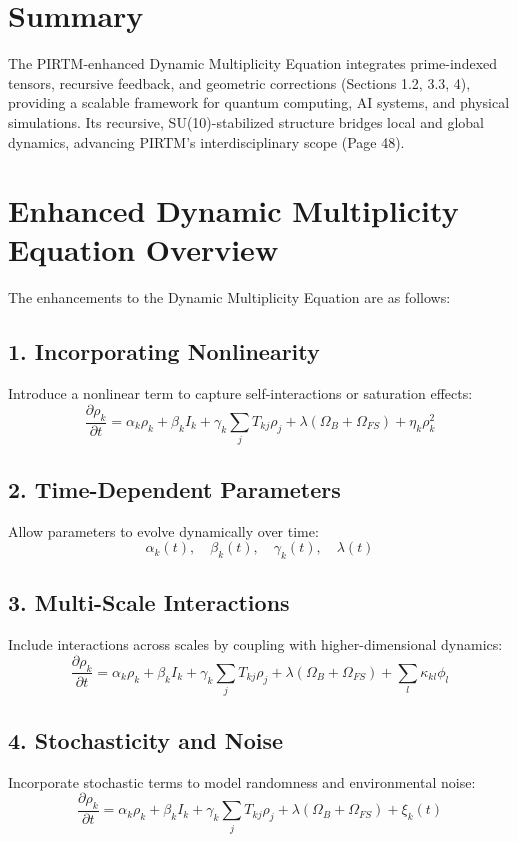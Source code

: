 \documentclass{article}
\theoremstyle{plain}
\begin{document}
\section*{Summary}
The PIRTM-enhanced Dynamic Multiplicity Equation integrates prime-indexed tensors, recursive feedback, and geometric corrections (Sections 1.2, 3.3, 4), providing a scalable framework for quantum computing, AI systems, and physical simulations. Its recursive, SU(10)-stabilized structure bridges local and global dynamics, advancing PIRTM’s interdisciplinary scope (Page 48).
\section*{Enhanced Dynamic Multiplicity Equation Overview}

The enhancements to the Dynamic Multiplicity Equation are as follows:

\subsection*{1. Incorporating Nonlinearity}
Introduce a nonlinear term to capture self-interactions or saturation effects:
\begin{equation}
\frac{\partial \rho_k}{\partial t} = \alpha_k \rho_k + \beta_k I_k + \gamma_k \sum_j T_{kj} \rho_j + \lambda (\Omega_B + \Omega_{FS}) + \eta_k \rho_k^2
\end{equation}

\subsection*{2. Time-Dependent Parameters}
Allow parameters to evolve dynamically over time:
\begin{equation}
\alpha_k(t), \quad \beta_k(t), \quad \gamma_k(t), \quad \lambda(t)
\end{equation}

\subsection*{3. Multi-Scale Interactions}
Include interactions across scales by coupling with higher-dimensional dynamics:
\begin{equation}
\frac{\partial \rho_k}{\partial t} = \alpha_k \rho_k + \beta_k I_k + \gamma_k \sum_j T_{kj} \rho_j + \lambda (\Omega_B + \Omega_{FS}) + \sum_l \kappa_{kl} \phi_l
\end{equation}

\subsection*{4. Stochasticity and Noise}
Incorporate stochastic terms to model randomness and environmental noise:
\begin{equation}
\frac{\partial \rho_k}{\partial t} = \alpha_k \rho_k + \beta_k I_k + \gamma_k \sum_j T_{kj} \rho_j + \lambda (\Omega_B + \Omega_{FS}) + \xi_k(t)
\end{equation}
\end{document}
